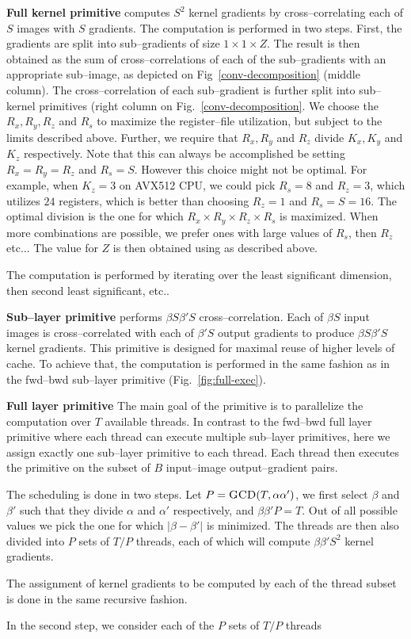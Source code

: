   {\bf Full kernel primitive} computes $S^2$ kernel gradients by
  cross--correlating each of $S$ images with $S$ gradients.  The
  computation is performed in two steps.  First, the gradients are
  split into sub--gradients of size $1 \times 1 \times Z$.  The result
  is then obtained as the sum of cross--correlations of each of the
  sub--gradients with an appropriate sub--image, as depicted on
  Fig~\ref{conv-decomposition} (middle column).  The
  cross--correlation of each sub--gradient is further split into
  sub--kernel primitives (right column on
  Fig.~\ref{conv-decomposition}.  We choose the $R_x, R_y, R_z$ and
  $R_s$ to maximize the register--file utilization, but subject to the
  limits described above.  Further, we require that $R_x, R_y$ and
  $R_z$ divide $K_x, K_y$ and $K_z$ respectively.  Note that this can
  always be accomplished be setting $R_x=R_y=R_z$ and $R_s=S$.
  However this choice might not be optimal.  For example, when $K_z=3$
  on AVX512 CPU, we could pick $R_s=8$ and $R_z=3$, which utilizes
  $24$ registers, which is better than choosing $R_z=1$ and
  $R_s=S=16$.  The optimal division is the one for which $R_x \times
  R_y \times R_z \times R_s$ is maximized.  When more combinations are
  possible, we prefer ones with large values of $R_s$, then $R_z$
  etc...  The value for $Z$ is then obtained using as described above.

  The computation is performed by iterating over the least significant
  dimension, then second least significant, etc..

  {\bf Sub--layer primitive} performs $\beta S \beta' S$
  cross--correlation.  Each of $\beta S$ input images is
  cross--correlated with each of $\beta'S$ output gradients to produce
  $\beta S \beta' S$ kernel gradients.  This primitive is designed for
  maximal reuse of higher levels of cache.  To achieve that, the
  computation is performed in the same fashion as in the fwd--bwd
  sub--layer primitive (Fig.~\ref{fig:full-exec}).

  {\bf Full layer primitive} \quad The main goal of the primitive is
  to parallelize the computation over $T$ available threads.  In
  contrast to the fwd--bwd full layer primitive where each thread can
  execute multiple sub--layer primitives, here we assign exactly one
  sub--layer primitive to each thread.  Each thread then executes the
  primitive on the subset of $B$ input--image output--gradient pairs.

  The scheduling is done in two steps.  Let $P =
  \textnormal{\scshape GCD}(T,\alpha\alpha')$, we first select $\beta$ and $\beta'$
  such that they divide $\alpha$ and $\alpha'$ respectively, and
  $\beta\beta'P = T$.  Out of all possible values we pick the one for
  which $|\beta -\beta'|$ is minimized.  The threads are then also
  divided into $P$ sets of $T/P$ threads, each of which will compute
  $\beta\beta'S^2$ kernel gradients.

  The assignment of kernel gradients to be computed by each of the
  thread subset is done in the same recursive fashion.

  In the second step, we consider each of the $P$ sets of $T/P$
  threads
